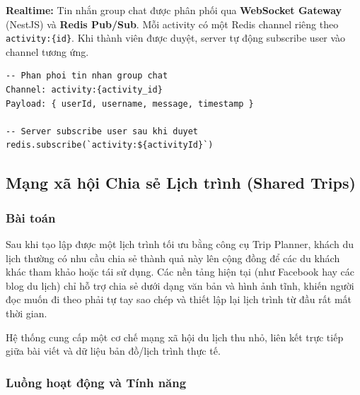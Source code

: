 \documentclass[12pt,a4paper]{article}
\begin{document}
\textbf{Realtime:} Tin nhắn group chat được phân phối qua \textbf{WebSocket
Gateway} (NestJS) và \textbf{Redis Pub/Sub}. Mỗi activity có một Redis channel
riêng theo \texttt{activity:\{id\}}. Khi thành viên được duyệt, server tự động
subscribe user vào channel tương ứng.

\begin{lstlisting}[language={}]
-- Phan phoi tin nhan group chat
Channel: activity:{activity_id}
Payload: { userId, username, message, timestamp }

-- Server subscribe user sau khi duyet
redis.subscribe(`activity:${activityId}`)
\end{lstlisting}

\subsection{Mạng xã hội Chia sẻ Lịch trình (Shared Trips)}

\subsubsection{Bài toán}

Sau khi tạo lập được một lịch trình tối ưu bằng công cụ Trip Planner, khách du
lịch thường có nhu cầu chia sẻ thành quả này lên cộng đồng để các du khách
khác tham khảo hoặc tái sử dụng. Các nền tảng hiện tại (như Facebook hay các
blog du lịch) chỉ hỗ trợ chia sẻ dưới dạng văn bản và hình ảnh tĩnh, khiến
người đọc muốn đi theo phải tự tay sao chép và thiết lập lại lịch trình từ đầu
rất mất thời gian.

Hệ thống cung cấp một cơ chế mạng xã hội du lịch thu nhỏ, liên kết trực
tiếp giữa bài viết và dữ liệu bản đồ/lịch trình thực tế.

\subsubsection{Luồng hoạt động và Tính năng}
\end{document}
